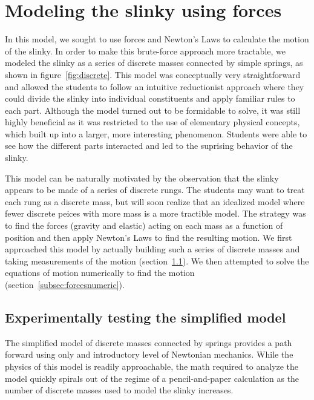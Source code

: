 \documentclass[aps,pre,10pt,superscriptaddress,showpacs,amsmath,amssymb,nofootinbib]{revtex4-1}
\newcommand{\subsec}[1]{section~\ref{subsec:#1}}
\newcommand{\fig}[1]{figure~\ref{fig:#1}}
\begin{document}
\section{Modeling the slinky using forces}
\label{sec:forces}

In this model, we sought to use forces and Newton's Laws to calculate the
motion of the slinky. In order to make this brute-force approach more tractable, we
modeled the slinky as a series of discrete masses connected by simple springs, as
shown in \fig{discrete}. This
model was conceptually very straightforward and allowed the students to follow an
intuitive reductionist approach where they could divide the slinky into individual
constituents and apply familiar rules to each part. Although the model turned out to
be formidable to solve, it was still highly beneficial as it was restricted to the
use of elementary physical concepts, which built up into a larger, more interesting
phenomenon. Students were able to see how the different parts interacted and led
to the suprising behavior of the slinky.

This model can be naturally motivated
by the observation that the slinky appears to be made of a series of discrete rungs.  The students may want 
to treat each rung as a discrete mass, but will soon realize that an idealized model where fewer discrete peices 
with more mass is a more tractible model.  The strategy  was to find the forces (gravity and elastic) acting on 
each mass as a function of position and then
apply Newton's Laws to find the resulting motion. We first approached this model
by actually building such a series of discrete masses and taking measurements of
the motion (\subsec{forcesexperiment}). We then attempted to solve the equations
of motion numerically to find the motion (\subsec{forcesnumeric}).

\subsection{Experimentally testing the simplified model}
\label{subsec:forcesexperiment}

The simplified model of discrete masses connected by springs provides a path forward using
only and introductory level of Newtonian mechanics.  While the physics of this model 
is readily approachable, the math required to analyze the model quickly spirals out of 
the regime of a pencil-and-paper calculation as the number of discrete masses used to model 
the slinky increases.  

\end{document}
